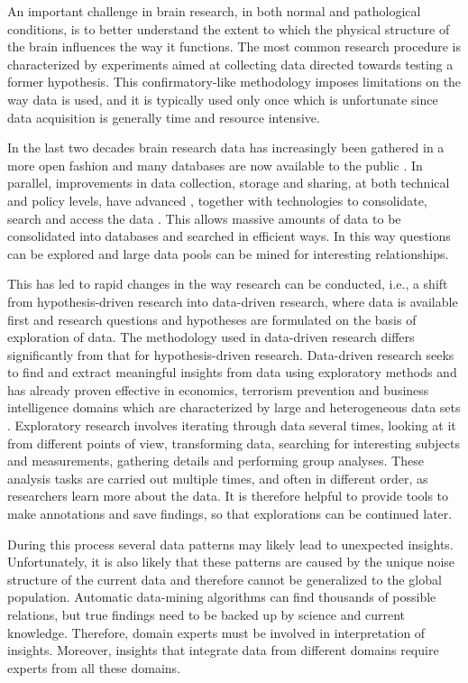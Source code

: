 \documentclass{frontiersHLTH}
\begin{document}
An important challenge in brain research, in both normal and pathological conditions, is to better understand the extent to which the physical structure of the brain influences the way it functions. The most common research procedure is characterized by experiments aimed at collecting data directed towards testing a former hypothesis. This confirmatory-like methodology imposes limitations on the way data is used, and it is typically used only once which is unfortunate since data acquisition is generally time and resource intensive.


In the last two decades brain research data has increasingly been gathered in a more open fashion and many databases are now available to the public \cite{milham_open_2012}. In parallel, improvements in data collection, storage and sharing, at both technical and policy levels, have advanced \cite{eckersley_neuroscience_2003}, together with technologies to consolidate, search and access the data \cite{van_horn_is_2009,wood_harnessing_2014}. This allows massive amounts of data to be consolidated into databases and searched in efficient ways. In this way questions can be explored and large data pools can be mined for interesting relationships.




This has led to rapid changes in the way research can be conducted, i.e., a shift from hypothesis-driven research into data-driven research, where data is available first and research questions and hypotheses are formulated on the basis of exploration of data. The methodology used in data-driven research differs significantly from that for hypothesis-driven research. Data-driven research seeks to find and extract meaningful insights from data using exploratory methods \cite{tukey_we_1980} and has already proven effective in economics, terrorism prevention and business intelligence domains which are characterized by large and heterogeneous data sets \cite{cook_illuminating_2005}. Exploratory research involves iterating through data several times, looking at it from different points of view, transforming data, searching for interesting subjects and measurements, gathering details and performing group analyses. These analysis tasks are carried out multiple times, and often in different order, as researchers learn more about the data. It is therefore helpful to provide tools to make annotations and save findings, so that explorations can be continued later.


During this process several data patterns may likely lead to unexpected insights. Unfortunately, it is also likely that these patterns are caused by the unique noise structure of the current data and therefore cannot be generalized to the global population. Automatic data-mining algorithms can find thousands of possible relations, but true findings need to be backed up by science and current knowledge.  Therefore, domain experts must be involved in interpretation of insights. Moreover, insights that integrate data from different domains require experts from all these domains.
\end{document}
